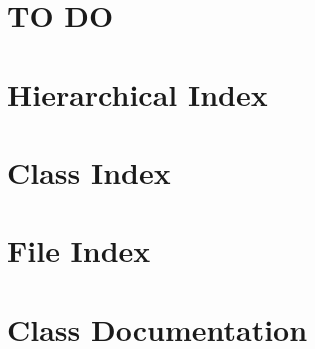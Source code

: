 \documentclass[twoside]{book}
\begin{document}
\chapter{T\-O D\-O}
\label{md_TODO}
\hypertarget{md_TODO}{}

\chapter{Hierarchical Index}

\chapter{Class Index}

\chapter{File Index}

\chapter{Class Documentation}
























\end{document}
